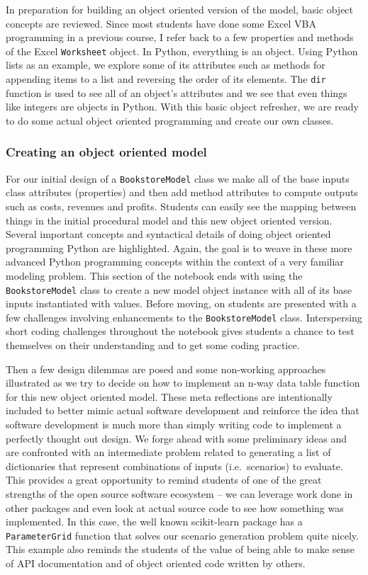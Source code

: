 \documentclass[ited,blindrev]{informs3}              %
\newcommand{\code}[1]{\texttt{#1}}
\begin{document}
In preparation for building an object oriented version of the model, basic object concepts are reviewed. Since most students have done some Excel VBA programming in a previous course, I refer back to a few properties and methods of the Excel \code{Worksheet} object. In Python, everything is an object. Using Python lists as an example, we explore some of its attributes such as methods for appending items to a list and reversing the order of its elements. The \code{dir} function is used to see all of an object's attributes and we see that even things like integers are objects in Python. With this basic object refresher, we are ready to do some actual object oriented programming and create our own classes.

\subsubsection{Creating an object oriented model}

For our initial design of a \code{BookstoreModel} class we make all of the base inputs class attributes (properties) and then add method attributes to compute outputs such as costs, revenues and profits. Students can easily see the mapping between things in the initial procedural model and this new object oriented version. Several important concepts and syntactical details of doing object oriented programming Python are highlighted. Again, the goal is to weave in these more advanced Python programming concepts within the context of a very familiar modeling problem. This section of the notebook ends with using the \code{BookstoreModel} class to create a new model object instance with all of its base inputs instantiated with values. Before moving, on students are presented with a few challenges involving enhancements to the \code{BookstoreModel} class. Interspersing short coding challenges throughout the notebook gives students a chance to test themselves on their understanding and to get some coding practice.

Then a few design dilemmas are posed and some non-working approaches illustrated as we try to decide on how to implement an n-way data table function for this new object oriented model. These meta reflections are intentionally included to better mimic actual software development and reinforce the idea that software development is much more than simply writing code to implement a perfectly thought out design. We forge ahead with some preliminary ideas and are confronted with an intermediate problem related to generating a list of dictionaries that represent combinations of inputs (i.e.\ scenarios) to evaluate. This provides a great opportunity to remind students of one of the great strengths of the open source software ecosystem -- we can leverage work done in other packages and even look at actual source code to see how something was implemented. In this case, the well known scikit-learn package \cite{bibid} has a \code{ParameterGrid} function that solves our scenario generation problem quite nicely. This example also reminds the students of the value of being able to make sense of API documentation and of object oriented code written by others. 
\end{document}
